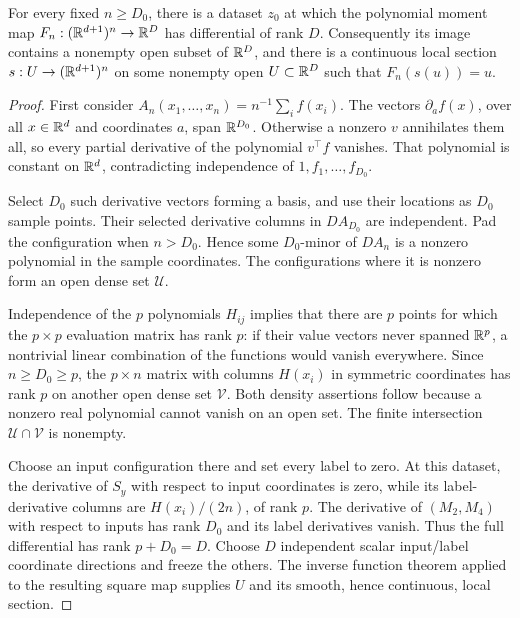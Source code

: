 \begin{lemma}
\label{lem:memory-fullrank}
For every fixed $n\ge D_0$, there is a dataset $z_0$ at which the
polynomial moment map $F_n:(\mathbb R^{d+1})^n\to\mathbb R^D$ has differential of
rank $D$. Consequently its image contains a nonempty open subset of
$\mathbb R^D$, and there is a continuous local section $s:U\to(\mathbb R^{d+1})^n$
on some nonempty open $U\subset\mathbb R^D$ such that $F_n(s(u))=u$.
\end{lemma}
\begin{proof}
First consider $A_n(x_1,\ldots,x_n)=n^{-1}\sum_i f(x_i)$.
The vectors $\partial_a f(x)$, over all $x\in\mathbb R^d$ and coordinates
$a$, span $\mathbb R^{D_0}$. Otherwise a nonzero $v$ annihilates them all,
so every partial derivative of the polynomial $v^\top f$ vanishes.
That polynomial is constant on $\mathbb R^d$, contradicting independence
of $1,f_1,\ldots,f_{D_0}$.

Select $D_0$ such derivative vectors forming a basis, and use their
locations as $D_0$ sample points. Their selected derivative columns in
$DA_{D_0}$ are independent. Pad the configuration when $n>D_0$.
Hence some $D_0$-minor of $DA_n$ is a nonzero polynomial in the sample
coordinates. The configurations where it is nonzero form an open dense
set $\mathcal U$.

Independence of the $p$ polynomials $H_{ij}$ implies that there are
$p$ points for which the $p\times p$ evaluation matrix has rank $p$:
if their value vectors never spanned $\mathbb R^p$, a nontrivial linear
combination of the functions would vanish everywhere. Since $n\ge
D_0\ge p$, the $p\times n$ matrix with columns $H(x_i)$ in symmetric
coordinates has rank $p$ on another open dense set $\mathcal V$.
Both density assertions follow because a nonzero real polynomial
cannot vanish on an open set. The finite intersection
$\mathcal U\cap\mathcal V$ is nonempty.

Choose an input configuration there and set every label to zero.
At this dataset, the derivative of $S_y$ with respect to input
coordinates is zero, while its label-derivative columns are
$H(x_i)/(2n)$, of rank $p$. The derivative of $(M_2,M_4)$ with respect
to inputs has rank $D_0$ and its label derivatives vanish. Thus the
full differential has rank $p+D_0=D$. Choose $D$ independent scalar
input/label coordinate directions and freeze the others. The inverse
function theorem applied to the resulting square map supplies $U$
and its smooth, hence continuous, local section.
\end{proof}

